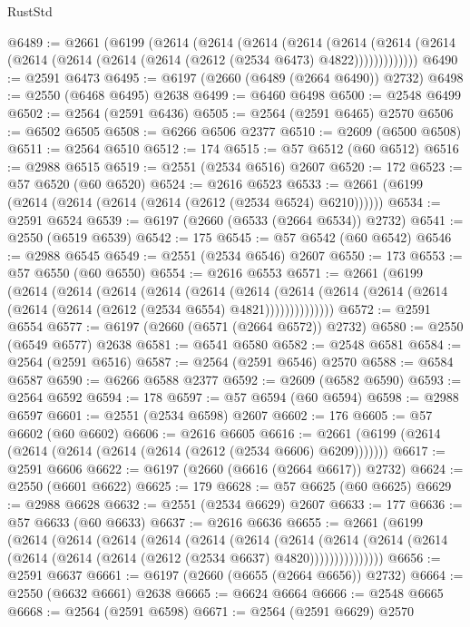 \begin{lexlean}{RustStd}
\begin{coremodule}
@6489 := @2661
    (@6199
      (@2614
        (@2614
          (@2614
            (@2614
              (@2614
                (@2614 (@2614 (@2614 (@2614 (@2614 (@2614 (@2612 (@2534 @6473) @4822)))))))))))))
@6490 := @2591 @6473
@6495 := @6197 (@2660 (@6489 (@2664 @6490)) @2732)
@6498 := @2550 (@6468 @6495) @2638
@6499 := @6460 @6498
@6500 := @2548 @6499
@6502 := @2564 (@2591 @6436)
@6505 := @2564 (@2591 @6465) @2570
@6506 := @6502 @6505
@6508 := @6266 @6506 @2377
@6510 := @2609 (@6500 @6508)
@6511 := @2564 @6510
@6512 := 174
@6515 := @57 @6512 (@60 @6512)
@6516 := @2988 @6515
@6519 := @2551 (@2534 @6516) @2607
@6520 := 172
@6523 := @57 @6520 (@60 @6520)
@6524 := @2616 @6523
@6533 := @2661 (@6199 (@2614 (@2614 (@2614 (@2614 (@2612 (@2534 @6524) @6210))))))
@6534 := @2591 @6524
@6539 := @6197 (@2660 (@6533 (@2664 @6534)) @2732)
@6541 := @2550 (@6519 @6539)
@6542 := 175
@6545 := @57 @6542 (@60 @6542)
@6546 := @2988 @6545
@6549 := @2551 (@2534 @6546) @2607
@6550 := 173
@6553 := @57 @6550 (@60 @6550)
@6554 := @2616 @6553
@6571 := @2661
    (@6199
      (@2614
        (@2614
          (@2614
            (@2614
              (@2614
                (@2614
                  (@2614 (@2614 (@2614 (@2614 (@2614 (@2614 (@2612 (@2534 @6554) @4821))))))))))))))
@6572 := @2591 @6554
@6577 := @6197 (@2660 (@6571 (@2664 @6572)) @2732)
@6580 := @2550 (@6549 @6577) @2638
@6581 := @6541 @6580
@6582 := @2548 @6581
@6584 := @2564 (@2591 @6516)
@6587 := @2564 (@2591 @6546) @2570
@6588 := @6584 @6587
@6590 := @6266 @6588 @2377
@6592 := @2609 (@6582 @6590)
@6593 := @2564 @6592
@6594 := 178
@6597 := @57 @6594 (@60 @6594)
@6598 := @2988 @6597
@6601 := @2551 (@2534 @6598) @2607
@6602 := 176
@6605 := @57 @6602 (@60 @6602)
@6606 := @2616 @6605
@6616 := @2661 (@6199 (@2614 (@2614 (@2614 (@2614 (@2614 (@2612 (@2534 @6606) @6209)))))))
@6617 := @2591 @6606
@6622 := @6197 (@2660 (@6616 (@2664 @6617)) @2732)
@6624 := @2550 (@6601 @6622)
@6625 := 179
@6628 := @57 @6625 (@60 @6625)
@6629 := @2988 @6628
@6632 := @2551 (@2534 @6629) @2607
@6633 := 177
@6636 := @57 @6633 (@60 @6633)
@6637 := @2616 @6636
@6655 := @2661
    (@6199
      (@2614
        (@2614
          (@2614
            (@2614
              (@2614
                (@2614
                  (@2614
                    (@2614
                      (@2614 (@2614 (@2614 (@2614 (@2614 (@2612 (@2534 @6637) @4820)))))))))))))))
@6656 := @2591 @6637
@6661 := @6197 (@2660 (@6655 (@2664 @6656)) @2732)
@6664 := @2550 (@6632 @6661) @2638
@6665 := @6624 @6664
@6666 := @2548 @6665
@6668 := @2564 (@2591 @6598)
@6671 := @2564 (@2591 @6629) @2570

\end{coremodule}
\end{lexlean}
